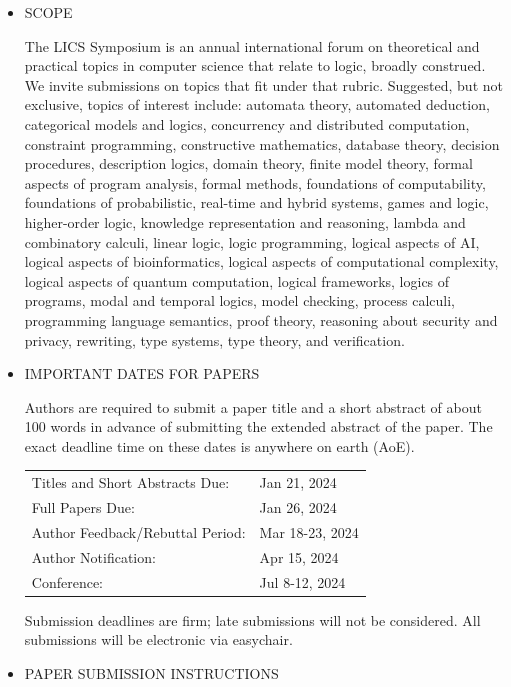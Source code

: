 \documentclass[prodmode,acmtecs]{acmsmall} %
\begin{document}
\begin{itemize}\item  SCOPE 
 
  The LICS Symposium is an annual international forum on theoretical and practical topics in computer science that relate to logic, broadly construed. We invite submissions on topics that fit under that rubric. Suggested, but not exclusive, topics of interest include: automata theory, automated deduction, categorical models and logics, concurrency and distributed computation, constraint programming, constructive mathematics, database theory, decision procedures, description logics, domain theory, finite model theory, formal aspects of program analysis, formal methods, foundations of computability, foundations of probabilistic, real-time and hybrid systems, games and logic, higher-order logic, knowledge representation and reasoning, lambda and combinatory calculi, linear logic, logic programming, logical aspects of AI, logical aspects of bioinformatics, logical aspects of computational complexity, logical aspects of quantum computation, logical frameworks, logics of programs, modal and temporal logics, model checking, process calculi, programming language semantics, proof theory, reasoning about security and privacy, rewriting, type systems, type theory, and verification. 
 
\item  IMPORTANT DATES FOR PAPERS 
 
  Authors are required to submit a paper title and a short abstract of about 100 words in advance of submitting the extended abstract of the paper. The exact deadline time on these dates is anywhere on earth (AoE). 
 
\begin{tabulary}{\linewidth}{LL}Titles and Short Abstracts Due:  & Jan 21, 2024 \\
Full Papers Due:  & Jan 26, 2024 \\
Author Feedback/Rebuttal Period:  & Mar 18-23, 2024 \\
Author Notification:  & Apr 15, 2024 \\
Conference:  & Jul 8-12, 2024 \\
\end{tabulary}
 
   Submission deadlines are firm; late submissions will not be considered. All submissions will be electronic via easychair. 
 
\item  PAPER SUBMISSION INSTRUCTIONS 
 

\end{itemize}
\end{document}
